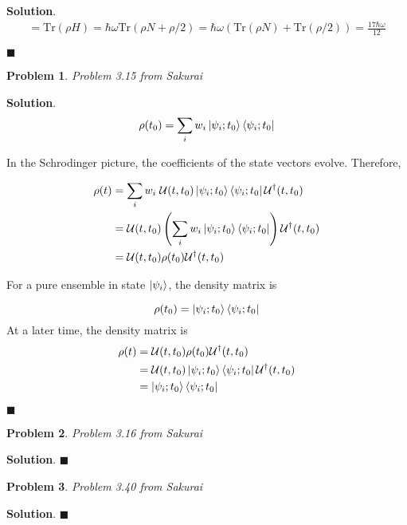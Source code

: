 \documentclass[12pt]{article}
\newtheorem{p}{Problem}
\theoremstyle{definition}
\newenvironment{s}{%
        \begin{trivlist} \item \textbf{Solution}. }{%
            \hspace*{\fill} $\blacksquare$\end{trivlist}}%
\begin{document}
{\begin{s}
\begin{align*}
[H] = \mathrm{Tr}(\rho H) = \hbar\omega\mathrm{Tr}(\rho N + \rho/2) = \hbar\omega\left(\mathrm{Tr}(\rho N) + \mathrm{Tr}(\rho/2)\right) = \frac{17\hbar\omega}{12}
\end{align*}

\end{s}

\begin{p}
Problem 3.15 from Sakurai
\end{p}

\begin{s}
\begin{align*}
\rho(t_{0}) &= \sum_{i}w_{i}\ket{\psi_{i};t_{0}}\bra{\psi_{i};t_{0}}\\
\end{align*}

In the Schrodinger picture, the coefficients of the state vectors evolve. Therefore,

\begin{align*}
\rho(t) &= \sum_{i}w_{i}\;\mathcal{U}(t,t_{0})\ket{\psi_{i};t_{0}}\bra{\psi_{i};t_{0}}\mathcal{U}^{\dagger}(t,t_{0})\\
&= \mathcal{U}(t,t_{0})\left(\sum_{i}w_{i}\ket{\psi_{i};t_{0}}\bra{\psi_{i};t_{0}}\right)\mathcal{U}^{\dagger}(t,t_{0})\\
&= \mathcal{U}(t,t_{0})\rho(t_{0})\mathcal{U}^{\dagger}(t,t_{0})
\end{align*}

For a pure ensemble in state $\ket{\psi_{i}}$, the density matrix is 

\begin{equation*}
\rho(t_{0}) = \ket{\psi_{i};t_{0}}\bra{\psi_{i};t_{0}}
\end{equation*}
At a later time, the density matrix is
\begin{align*}
\rho(t) &= \mathcal{U}(t,t_{0})\rho(t_{0})\mathcal{U}^{\dagger}(t,t_{0})\\
&= \mathcal{U}(t,t_{0})\ket{\psi_{i};t_{0}}\bra{\psi_{i};t_{0}}\mathcal{U}^{\dagger}(t,t_{0})\\
&= \ket{\psi_{i};t_{0}}\bra{\psi_{i};t_{0}}
\end{align*}

\end{s}

\begin{p}
Problem 3.16 from Sakurai
\end{p}

\begin{s}
\end{s}

\begin{p}
Problem 3.40 from Sakurai
\end{p}

\begin{s}
\end{s}
\end{document}
